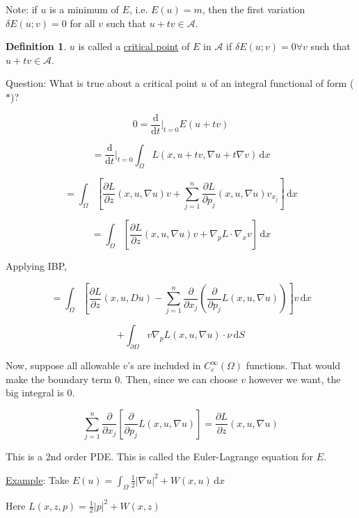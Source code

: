 \documentclass{article}
\theoremstyle{definition}
\newtheorem{definition}{Definition}
\begin{document}
Note: if \(u\) is a minimum of \(E\), i.e. \(E(u) = m\), then the first variation \(\delta E(u;v) = 0\) for all \(v\) such that \(u + tv \in \mathscr{A}\). 

\begin{definition}
    \(u\) is called a \underline{critical point} of \(E\) in \(\mathscr{A}\) if \(\delta E(u;v) = 0 \forall v\) such that \(u + tv \in \mathscr{A}\). 
\end{definition}

Question: What is true about a critical point \(u\) of an integral functional of form (\(\ast\))?

\[
    0 = \frac{\mathrm{d}}{\mathrm{d}t} \bigg\vert_{t=0} E(u+tv)
\]

\[
    = \frac{\mathrm{d}}{\mathrm{d}t} \bigg\vert_{t=0} \int_{\Omega }^{} L(x, u+tv, \nabla u + t\nabla v) \,\mathrm{d}x 
\]

\[
    = \int_{\Omega}^{} \left[ \frac{\partial L}{\partial z} (x, u, \nabla u) v + \sum_{j=1}^{n} \frac{\partial L}{\partial p_j} (x, u, \nabla u) v_{x_j} \right]  \,\mathrm{d}x 
\]

\[
    = \int_{\Omega}^{} \left[ \frac{\partial L}{\partial z} (x, u, \nabla u) v + \nabla_p L \cdot \nabla_x v \right]  \,\mathrm{d}x 
\]

Applying IBP,

\[
    = \int_{\Omega}^{} \left[ \frac{\partial L}{\partial z} (x, u, Du) - \sum_{j=1}^n \frac{\partial}{\partial x_j} \left( \frac{\partial }{\partial p_j} L(x,u, \nabla u) \right)  \right] v \,\mathrm{d}x 
\]

\[
    + \int_{\partial \Omega}^{} v \nabla_p L(x,u, \nabla u)\cdot \nu \,\mathrm{d}S 
\]

Now, suppose all allowable \(v\)'s are included in \(C_c^{\infty}(\Omega)\) functions. That would make the boundary term \(0\). Then, since we can choose \(v\) however we want, the big integral is \(0\). 

\[
    \sum_{j=1}^{n} \frac{\partial }{\partial x_j} \left[ \frac{\partial}{\partial p_j} L(x, u, \nabla u) \right] = \frac{\partial L}{\partial z} (x,u,\nabla u)
\]

This is a 2nd order PDE. This is called the Euler-Lagrange equation for \(E\).

\underline{Example}: Take \(\displaystyle E(u) = \int_{\Omega }^{} \frac{1}{2} \left\vert \nabla u \right\vert ^2 + W(x,u) \,\mathrm{d}x \)

Here \(L(x,z,p) = \frac{1}{2} \vert p \vert ^2 + W(x,z)\) 
\end{document}
